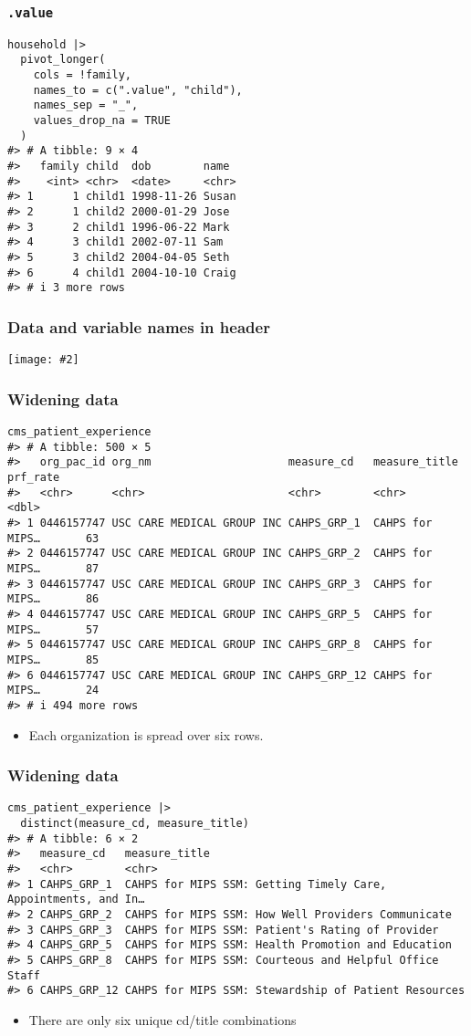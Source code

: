 \documentclass{beamer}
\newcommand{\bi}{\begin{itemize}}
\newcommand{\li}{\item}
\newcommand{\ei}{\end{itemize}}
\newcommand{\fig}[2]{\centerline{\texttt{[image: \#2]}}}
\newcommand{\bfr}[1]{\begin{frame}[fragile]\frametitle{{ #1 }}}
\begin{document}
\bfr{\tt .value}\scriptsize
\begin{verbatim}
household |> 
  pivot_longer(
    cols = !family, 
    names_to = c(".value", "child"), 
    names_sep = "_", 
    values_drop_na = TRUE
  )
#> # A tibble: 9 × 4
#>   family child  dob        name 
#>    <int> <chr>  <date>     <chr>
#> 1      1 child1 1998-11-26 Susan
#> 2      1 child2 2000-01-29 Jose 
#> 3      2 child1 1996-06-22 Mark 
#> 4      3 child1 2002-07-11 Sam  
#> 5      3 child2 2004-04-05 Seth 
#> 6      4 child1 2004-10-10 Craig
#> # i 3 more rows
\end{verbatim}
\end{frame}

\bfr{Data and variable names in header}
\fig{1}{names-and-values.png}
\end{frame}


\bfr{Widening data}\scriptsize
\begin{verbatim}
cms_patient_experience
#> # A tibble: 500 × 5
#>   org_pac_id org_nm                     measure_cd   measure_title   prf_rate
#>   <chr>      <chr>                      <chr>        <chr>              <dbl>
#> 1 0446157747 USC CARE MEDICAL GROUP INC CAHPS_GRP_1  CAHPS for MIPS…       63
#> 2 0446157747 USC CARE MEDICAL GROUP INC CAHPS_GRP_2  CAHPS for MIPS…       87
#> 3 0446157747 USC CARE MEDICAL GROUP INC CAHPS_GRP_3  CAHPS for MIPS…       86
#> 4 0446157747 USC CARE MEDICAL GROUP INC CAHPS_GRP_5  CAHPS for MIPS…       57
#> 5 0446157747 USC CARE MEDICAL GROUP INC CAHPS_GRP_8  CAHPS for MIPS…       85
#> 6 0446157747 USC CARE MEDICAL GROUP INC CAHPS_GRP_12 CAHPS for MIPS…       24
#> # i 494 more rows
\end{verbatim}
\bi
\li Each organization is spread over six rows.
\ei
\end{frame}

\bfr{Widening data}\scriptsize
\begin{verbatim}
cms_patient_experience |> 
  distinct(measure_cd, measure_title)
#> # A tibble: 6 × 2
#>   measure_cd   measure_title                                                 
#>   <chr>        <chr>                                                         
#> 1 CAHPS_GRP_1  CAHPS for MIPS SSM: Getting Timely Care, Appointments, and In…
#> 2 CAHPS_GRP_2  CAHPS for MIPS SSM: How Well Providers Communicate            
#> 3 CAHPS_GRP_3  CAHPS for MIPS SSM: Patient's Rating of Provider              
#> 4 CAHPS_GRP_5  CAHPS for MIPS SSM: Health Promotion and Education            
#> 5 CAHPS_GRP_8  CAHPS for MIPS SSM: Courteous and Helpful Office Staff        
#> 6 CAHPS_GRP_12 CAHPS for MIPS SSM: Stewardship of Patient Resources
\end{verbatim}
\bi
\li There are only six unique cd/title combinations
\ei
\end{frame}
\end{document}
